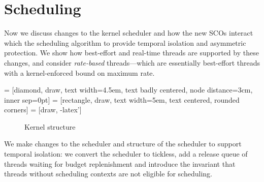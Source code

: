 \section{Scheduling}

Now we discuss changes to the kernel scheduler and how the new \glspl{SCO} interact which the
scheduling algorithm to provide temporal isolation and asymmetric protection.
We show how best-effort and real-time threads are supported by these changes, and consider \emph{rate-based} threads---which are essentially best-effort threads with a kernel-enforced bound on maximum rate.


 = [diamond, draw,
    text width=4.5em, text badly centered, node distance=3cm, inner sep=0pt]
 = [rectangle, draw,
    text width=5em, text centered, rounded corners]
 = [draw, -latex']


\begin{figure}
\caption{Kernel structure}
\label{figure:tickless}
\end{figure}

We make changes to the scheduler and structure of the scheduler to support temporal isolation: we
convert the scheduler to tickless, add a release queue of threads waiting for budget replenishment
and introduce the invariant that threads without scheduling contexts are not eligible for
scheduling.

